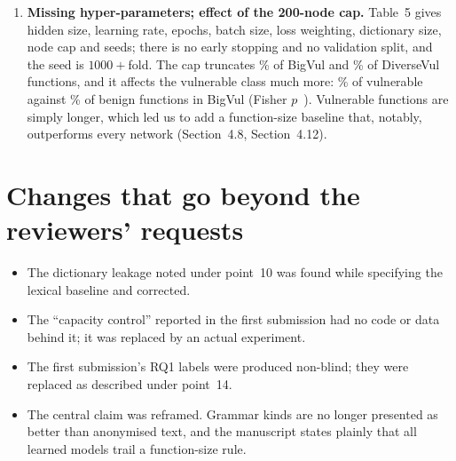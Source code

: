 \documentclass[11pt]{article}
\newcommand{\sect}[1]{Section~#1}
\begin{document}
\begin{enumerate}[leftmargin=*, label=\textbf{\arabic*.}]
\item \textbf{Missing hyper-parameters; effect of the 200-node cap.}
Table~5 gives hidden size, learning rate, epochs, batch size,
loss weighting, dictionary size, node cap and seeds; there is no early stopping
and no validation split, and the seed is $1000+$fold. The cap truncates
\numbigvulTruncPct\% of BigVul and \numdiversevulTruncPct\% of DiverseVul
functions, and it affects the vulnerable class much more:
\numbigvulTruncVulnPct\% of vulnerable against \numbigvulTruncBenignPct\% of
benign functions in BigVul (Fisher $p$~\numbigvulTruncP{}). Vulnerable functions
are simply longer, which led us to add a function-size baseline that, notably,
outperforms every network (\sect{4.8}, \sect{4.12}).
\end{enumerate}

\section*{Changes that go beyond the reviewers' requests}
\begin{itemize}[leftmargin=*]
\item The dictionary leakage noted under point~10 was found while specifying
the lexical baseline and corrected.
\item The ``capacity control'' reported in the first submission had no code or
data behind it; it was replaced by an actual experiment.
\item The first submission's RQ1 labels were produced non-blind; they were
replaced as described under point~14.
\item The central claim was reframed. Grammar kinds are no longer presented as
better than anonymised text, and the manuscript states plainly that all learned
models trail a function-size rule.
\end{itemize}
\end{document}
